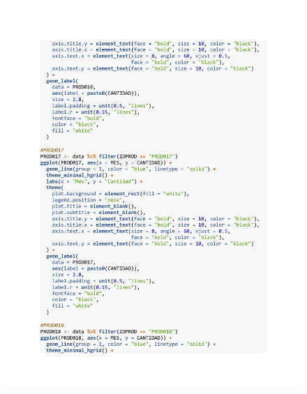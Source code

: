 \begin{figure}[h!]
        \begin{tcolorbox}[colback=white, colframe=black, boxrule=1.5pt, sharp corners=all]
            {\includegraphics[width=\linewidth, height=22cm, trim=2.5cm 2.5cm 2.5cm 2.5cm, clip]{images/script15.pdf}}
        \end{tcolorbox}
\end{figure}

